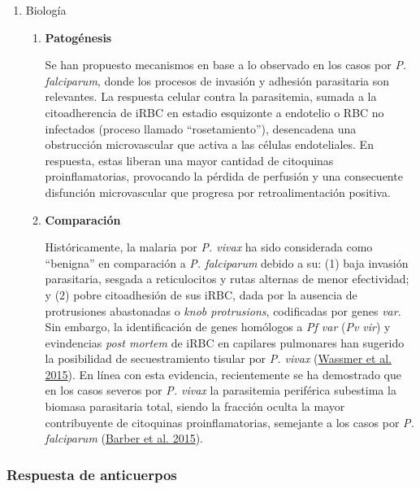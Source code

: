 \documentclass[
  a4paper]{article}
\begin{document}
\begin{enumerate}
\def\labelenumi{\alph{enumi}.}
\setcounter{enumi}{2}
\item
  Biología

  \begin{enumerate}
  \def\labelenumii{\roman{enumii}.}
  \item
    \textbf{Patogénesis}

    Se han propuesto mecanismos en base a lo observado en los casos por
    \emph{P. falciparum}, donde los procesos de invasión y adhesión
    parasitaria son relevantes. La respuesta celular contra la
    parasitemia, sumada a la citoadherencia de iRBC en estadio
    esquizonte a endotelio o RBC no infectados (proceso llamado
    ``rosetamiento''), desencadena una obstrucción microvascular que
    activa a las células endoteliales. En respuesta, estas liberan una
    mayor cantidad de citoquinas proinflamatorias, provocando la pérdida
    de perfusión y una consecuente disfunción microvascular que progresa
    por retroalimentación positiva.
  \item
    \textbf{Comparación}

    Históricamente, la malaria por \emph{P. vivax} ha sido considerada
    como ``benigna'' en comparación a \emph{P. falciparum} debido a su:
    (1) baja invasión parasitaria, sesgada a reticulocitos y rutas
    alternas de menor efectividad; y (2) pobre citoadhesión de sus iRBC,
    dada por la ausencia de protrusiones abastonadas o \emph{knob
    protrusions}, codificadas por genes \emph{var}. Sin embargo, la
    identificación de genes homólogos a \emph{Pf var} (\emph{Pv vir}) y
    evindencias \emph{post mortem} de iRBC en capilares pulmonares han
    sugerido la posibilidad de secuestramiento tisular por \emph{P.
    vivax} (\protect\hyperlink{ref-wassmer2015}{Wassmer et al. 2015}).
    En línea con esta evidencia, recientemente se ha demostrado que en
    los casos severos por \emph{P. vivax} la parasitemia periférica
    subestima la biomasa parasitaria total, siendo la fracción oculta la
    mayor contribuyente de citoquinas proinflamatorias, semejante a los
    casos por \emph{P. falciparum}
    (\protect\hyperlink{ref-barber2015}{Barber et al. 2015}).
  \end{enumerate}
\end{enumerate}

\hypertarget{respuesta-de-anticuerpos}{%
\subsubsection{Respuesta de
anticuerpos}\label{respuesta-de-anticuerpos}}
\end{document}
